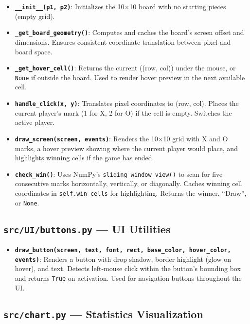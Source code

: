 \documentclass[12pt,a4paper]{article}
\begin{document}
\begin{itemize}
    \item \textbf{\texttt{\_\_init\_\_(p1, p2)}}: Initializes the 10×10 board with no starting pieces (empty grid).
    
    \item \textbf{\texttt{\_get\_board\_geometry()}}: Computes and caches the board's screen offset and dimensions. Ensures consistent coordinate translation between pixel and board space.
    
    \item \textbf{\texttt{\_get\_hover\_cell()}}: Returns the current ((row, col)) under the mouse, or \texttt{None} if outside the board. Used to render hover preview in the next available cell.
    
    \item \textbf{\texttt{handle\_click(x, y)}}: Translates pixel coordinates to (row, col). Places the current player's mark (1 for X, 2 for O) if the cell is empty. Switches the active player.
    
    \item \textbf{\texttt{draw\_screen(screen, events)}}: Renders the 10×10 grid with X and O marks, a hover preview showing where the current player would place, and highlights winning cells if the game has ended.
    
    \item \textbf{\texttt{check\_win()}}: Uses NumPy's \texttt{sliding\_window\_view()} to scan for five consecutive marks horizontally, vertically, or diagonally. Caches winning cell coordinates in \texttt{self.win\_cells} for highlighting. Returns the winner, ``Draw'', or \texttt{None}.
\end{itemize}

\subsection{\texttt{src/UI/buttons.py} — UI Utilities}

\begin{itemize}
    \item \textbf{\texttt{draw\_button(screen, text, font, rect, base\_color, hover\_color, events)}}: Renders a button with drop shadow, border highlight (glow on hover), and text. Detects left-mouse click within the button's bounding box and returns \texttt{True} on activation. Used for navigation buttons throughout the UI.
\end{itemize}

\subsection{\texttt{src/chart.py} — Statistics Visualization}
\end{document}
